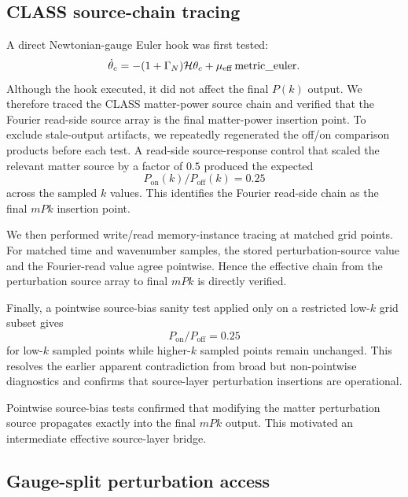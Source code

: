 ﻿\documentclass[11pt,prd,preprint,nofootinbib,amsmath,amssymb]{revtex4-2}
\begin{document}
\subsection{CLASS source-chain tracing}

A direct Newtonian-gauge Euler hook was first tested:
\begin{equation}
\dot\theta_c
=
-(1+\Gamma_N)\mathcal H\theta_c
+
\mu_{\rm eff}\,{\rm metric\_euler}.
\end{equation}
Although the hook executed, it did not affect the final $P(k)$ output. We
therefore traced the CLASS matter-power source chain and verified that the
Fourier read-side source array is the final matter-power insertion point. To
exclude stale-output artifacts, we repeatedly regenerated the off/on comparison
products before each test. A read-side source-response control that scaled the
relevant matter source by a factor of $0.5$ produced the expected
\begin{equation}
P_{\mathrm{on}}(k)/P_{\mathrm{off}}(k)=0.25
\end{equation}
across the sampled $k$ values. This identifies the Fourier read-side chain as
the final $mPk$ insertion point.

We then performed write/read memory-instance tracing at matched grid points.
For matched time and wavenumber samples, the stored perturbation-source value
and the Fourier-read value agree pointwise. Hence the effective chain from the
perturbation source array to final $mPk$ is directly verified.

Finally, a pointwise source-bias sanity test applied only on a restricted
low-$k$ grid subset gives
\begin{equation}
P_{\mathrm{on}}/P_{\mathrm{off}}=0.25
\end{equation}
for low-$k$ sampled points while higher-$k$ sampled points remain unchanged.
This resolves the earlier apparent contradiction from broad but non-pointwise
diagnostics and confirms that source-layer perturbation insertions are
operational.

Pointwise source-bias tests confirmed that modifying the matter perturbation
source propagates exactly into the final $mPk$ output. This motivated an
intermediate effective source-layer bridge.

\subsection{Gauge-split perturbation access}
\end{document}
